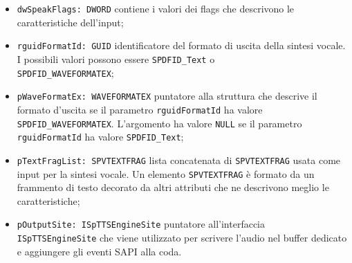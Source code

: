 \begin{itemize}
	\begin{itemize}
		\item \texttt{dwSpeakFlags: DWORD} contiene i valori dei flags che descrivono le caratteristiche dell'input;
		\item \texttt{rguidFormatId: GUID} identificatore del formato di uscita della sintesi vocale. I possibili valori possono essere \texttt{SPDFID\_Text} o\\ \texttt{SPDFID\_WAVEFORMATEX};
		\item \texttt{pWaveFormatEx: WAVEFORMATEX} puntatore alla struttura che descrive il formato d'uscita se il parametro \texttt{rguidFormatId} ha valore\\ \texttt{SPDFID\_WAVEFORMATEX}. L'argomento ha valore \texttt{NULL} se il parametro \texttt{rguidFormatId} ha valore \texttt{SPDFID\_Text};
		\item \texttt{pTextFragList: SPVTEXTFRAG} lista concatenata di \texttt{SPVTEXTFRAG} usata come input per la sintesi vocale. Un elemento \texttt{SPVTEXTFRAG} è formato da un frammento di testo decorato da altri attributi che ne descrivono meglio le caratteristiche;
		\item \texttt{pOutputSite: ISpTTSEngineSite} puntatore all'interfaccia\\ \texttt{ISpTTSEngineSite} che viene utilizzato per scrivere l'audio nel buffer dedicato e aggiungere gli eventi SAPI alla coda.
	\end{itemize}  
\end{itemize}

